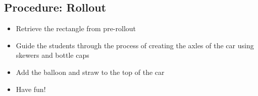 \documentclass{article}
\begin{document}
    \subsection{Procedure: Rollout}
        \begin{itemize}
            \item Retrieve the rectangle from pre-rollout
            \item Guide the students through the process of creating the axles of the car using skewers and bottle caps
            \item Add the balloon and straw to the top of the car
            \item Have fun!
        \end{itemize}
\end{document}
